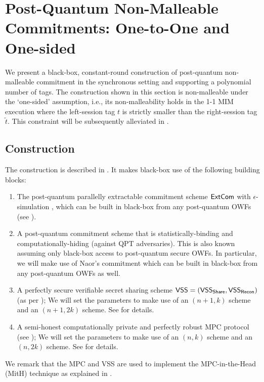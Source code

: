 
\section{Post-Quantum Non-Malleable Commitments: One-to-One and One-sided}
\label{sec:PQNMC:1-1}
We present a black-box, constant-round construction of post-quantum non-malleable commitment in the synchronous setting and supporting a polynomial number of tags. The construction shown in this section is non-malleable under the `one-sided' assumption, i.e., its non-malleability holds in the 1-1 MIM execution where the left-session tag $t$ is strictly smaller than the right-session tag $\tilde{t}$. This constraint will be subsequently alleviated in . 

\subsection{Construction}
\label{sec:BB-NMC:construction}

The construction is described in . It makes black-box use of the following building blocks:
\begin{enumerate}
\item
The post-quantum parallelly extractable commitment scheme $\mathsf{ExtCom}$ with $\epsilon$-simulation , which can be built in black-box from any post-quantum OWFs (see ).

\item
    A post-quantum commitment scheme that is statistically-binding and computationally-hiding (against QPT adversaries). This is also known assuming only black-box access to post-quantum secure OWFs. In particular, we will make use of Naor's commitment which can be built in black-box from any post-quantum OWFs as well.
\item
     A perfectly secure verifiable secret sharing scheme $\mathsf{VSS} = (\mathsf{VSS}_{\mathsf{Share}}, \mathsf{VSS}_{\mathsf{Recon}})$ (as per ); We will set the parameters to make use of an $(n+1, k)$ scheme and an $(n+1, 2k)$ scheme. See  for details.
\item
    A semi-honest computationally private and perfectly robust MPC protocol (see ); We will set the parameters to make use of an $(n, k)$ scheme and an $(n, 2k)$ scheme. See  for details. 
\end{enumerate}
We remark that the MPC and VSS are used to implement the MPC-in-the-Head (MitH) technique as explained in .


